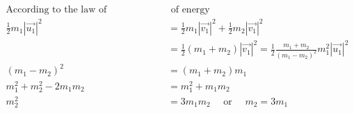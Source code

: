 \begin{enumerate}
\begin{answer}
\begin{align*}
\text{According to the law of conservation}&\text{ of energy}\\
	\frac{1}{2} m_{1}\left|\overrightarrow{u_{1}}\right|^{2}&=\frac{1}{2} m_{1}\left|\overrightarrow{v_{1}}\right|^{2}+\frac{1}{2} m_{2}\left|\overrightarrow{v_{1}}\right|^{2} \\
&=\frac{1}{2}\left(m_{1}+m_{2}\right)\left|\overrightarrow{v_{1}}\right|^{2}=\frac{1}{2} \frac{m_{1}+m_{2}}{\left(m_{1}-m_{2}\right)^{2}} m_{1}^{2}\left|\overrightarrow{u_{1}}\right|^{2} \\
\left(m_{1}-m_{2}\right)^{2}&=\left(m_{1}+m_{2}\right) m_{1} \\
m_{1}^{2}+m_{2}^{2}-2 m_{1} m_{2}&=m_{1}^{2}+m_{1} m_{2} \\
m_{2}^{2}&=3 m_{1} m_{2} \quad \text { or } \quad m_{2}=3 m_{1}
	\end{align*}
\end{answer}
\end{enumerate}